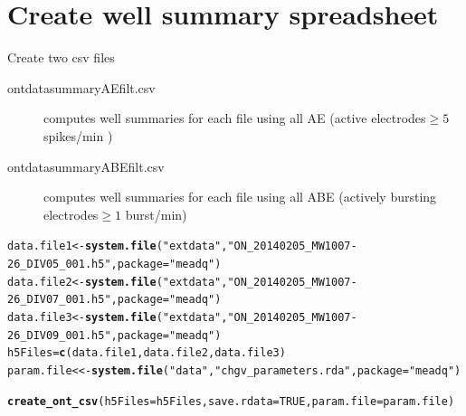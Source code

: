 \documentclass{article}\usepackage[]{graphicx}\usepackage[]{color}
\makeatletter
\newcommand{\hlnum}[1]{\textcolor[rgb]{0.686,0.059,0.569}{#1}}%
\newcommand{\hlstr}[1]{\textcolor[rgb]{0.192,0.494,0.8}{#1}}%
\newcommand{\hlstd}[1]{\textcolor[rgb]{0.345,0.345,0.345}{#1}}%
\newcommand{\hlkwb}[1]{\textcolor[rgb]{0.69,0.353,0.396}{#1}}%
\newcommand{\hlkwc}[1]{\textcolor[rgb]{0.333,0.667,0.333}{#1}}%
\newcommand{\hlkwd}[1]{\textcolor[rgb]{0.737,0.353,0.396}{\textbf{#1}}}%
\newenvironment{kframe}{%
 \def\at@end@of@kframe{}%
 \ifinner\ifhmode%
  \def\at@end@of@kframe{\end{minipage}}%
  \begin{minipage}{\columnwidth}%
 \fi\fi%
 \def\FrameCommand##1{\hskip\@totalleftmargin \hskip-\fboxsep
 \colorbox{shadecolor}{##1}\hskip-\fboxsep
     \hskip-\linewidth \hskip-\@totalleftmargin \hskip\columnwidth}%
 \MakeFramed {\advance\hsize-\width
   \@totalleftmargin\z@ \linewidth\hsize
   \@setminipage}}%
 {\par\unskip\endMakeFramed%
 \at@end@of@kframe}
\newenvironment{knitrout}{}{} %
\makeatother
\begin{document}
\section*{Create well summary spreadsheet}
Create two csv files \colon

\begin{description}
\item[ ont\textunderscore data\textunderscore summary\textunderscore AEfilt.csv] computes well summaries for each file using all AE (active electrodes\colon  $\geq 5$ spikes/min ) 
\item[ ont\textunderscore data\textunderscore summary\textunderscore ABEfilt.csv] computes well summaries for each file using all ABE (actively bursting electrodes\colon  $\geq 1$ burst/min)
\end{description}

\begin{knitrout}
\color{fgcolor}\begin{kframe}
\begin{alltt}
\hlstd{data.file1} \hlkwb{<-} \hlkwd{system.file}\hlstd{(}\hlstr{"extdata"}\hlstd{,} \hlstr{"ON_20140205_MW1007-26_DIV05_001.h5"}\hlstd{,} \hlkwc{package} \hlstd{=} \hlstr{"meadq"}\hlstd{)}
\hlstd{data.file2} \hlkwb{<-} \hlkwd{system.file}\hlstd{(}\hlstr{"extdata"}\hlstd{,} \hlstr{"ON_20140205_MW1007-26_DIV07_001.h5"}\hlstd{,} \hlkwc{package} \hlstd{=} \hlstr{"meadq"}\hlstd{)}
\hlstd{data.file3} \hlkwb{<-} \hlkwd{system.file}\hlstd{(}\hlstr{"extdata"}\hlstd{,} \hlstr{"ON_20140205_MW1007-26_DIV09_001.h5"}\hlstd{,} \hlkwc{package} \hlstd{=} \hlstr{"meadq"}\hlstd{)}
\hlstd{h5Files} \hlkwb{=} \hlkwd{c}\hlstd{(data.file1, data.file2, data.file3)}
\hlstd{param.file} \hlkwb{<<-} \hlkwd{system.file}\hlstd{(}\hlstr{"data"}\hlstd{,} \hlstr{"chgv_parameters.rda"}\hlstd{,} \hlkwc{package} \hlstd{=} \hlstr{"meadq"}\hlstd{)}

\hlkwd{create_ont_csv}\hlstd{(}\hlkwc{h5Files} \hlstd{= h5Files,} \hlkwc{save.rdata} \hlstd{=} \hlnum{TRUE}\hlstd{,} \hlkwc{param.file} \hlstd{= param.file)}
\end{alltt}


{\ttfamily\noindent\bfseries\color{errorcolor}{\#\# Error: unused argument (param.file = param.file)}}\end{kframe}
\end{knitrout}
\end{document}

